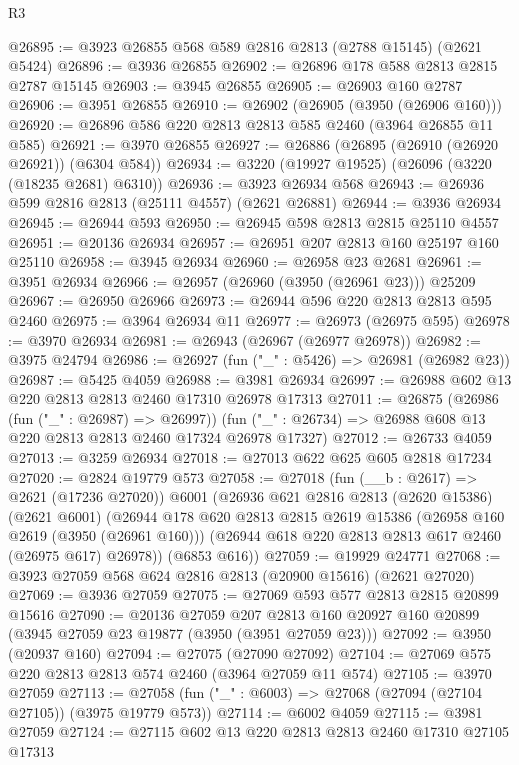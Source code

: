 \begin{lexlean}{R3}
\begin{coremodule}
@26895 := @3923 @26855 @568 @589 @2816 @2813 (@2788 @15145) (@2621 @5424)
@26896 := @3936 @26855
@26902 := @26896 @178 @588 @2813 @2815 @2787 @15145
@26903 := @3945 @26855
@26905 := @26903 @160 @2787
@26906 := @3951 @26855
@26910 := @26902 (@26905 (@3950 (@26906 @160)))
@26920 := @26896 @586 @220 @2813 @2813 @585 @2460 (@3964 @26855 @11 @585)
@26921 := @3970 @26855
@26927 := @26886 (@26895 (@26910 (@26920 @26921)) (@6304 @584))
@26934 := @3220 (@19927 @19525) (@26096 (@3220 (@18235 @2681) @6310))
@26936 := @3923 @26934 @568
@26943 := @26936 @599 @2816 @2813 (@25111 @4557) (@2621 @26881)
@26944 := @3936 @26934
@26945 := @26944 @593
@26950 := @26945 @598 @2813 @2815 @25110 @4557
@26951 := @20136 @26934
@26957 := @26951 @207 @2813 @160 @25197 @160 @25110
@26958 := @3945 @26934
@26960 := @26958 @23 @2681
@26961 := @3951 @26934
@26966 := @26957 (@26960 (@3950 (@26961 @23))) @25209
@26967 := @26950 @26966
@26973 := @26944 @596 @220 @2813 @2813 @595 @2460
@26975 := @3964 @26934 @11
@26977 := @26973 (@26975 @595)
@26978 := @3970 @26934
@26981 := @26943 (@26967 (@26977 @26978))
@26982 := @3975 @24794
@26986 := @26927 (fun ("_" : @5426) => @26981 (@26982 @23))
@26987 := @5425 @4059
@26988 := @3981 @26934
@26997 := @26988 @602 @13 @220 @2813 @2813 @2460 @17310 @26978 @17313
@27011 := @26875
    (@26986 (fun ("_" : @26987) => @26997))
    (fun ("_" : @26734) => @26988 @608 @13 @220 @2813 @2813 @2460 @17324 @26978 @17327)
@27012 := @26733 @4059
@27013 := @3259 @26934
@27018 := @27013 @622 @625 @605 @2818 @17234
@27020 := @2824 @19779 @573
@27058 := @27018
    (fun (__b : @2617) => @2621 (@17236 @27020))
    @6001
    (@26936
      @621
      @2816
      @2813
      (@2620 @15386)
      (@2621 @6001)
      (@26944
        @178
        @620
        @2813
        @2815
        @2619
        @15386
        (@26958 @160 @2619 (@3950 (@26961 @160)))
        (@26944 @618 @220 @2813 @2813 @617 @2460 (@26975 @617) @26978))
      (@6853 @616))
@27059 := @19929 @24771
@27068 := @3923 @27059 @568 @624 @2816 @2813 (@20900 @15616) (@2621 @27020)
@27069 := @3936 @27059
@27075 := @27069 @593 @577 @2813 @2815 @20899 @15616
@27090 := @20136
    @27059
    @207
    @2813
    @160
    @20927
    @160
    @20899
    (@3945 @27059 @23 @19877 (@3950 (@3951 @27059 @23)))
@27092 := @3950 (@20937 @160)
@27094 := @27075 (@27090 @27092)
@27104 := @27069 @575 @220 @2813 @2813 @574 @2460 (@3964 @27059 @11 @574)
@27105 := @3970 @27059
@27113 := @27058 (fun ("_" : @6003) => @27068 (@27094 (@27104 @27105)) (@3975 @19779 @573))
@27114 := @6002 @4059
@27115 := @3981 @27059
@27124 := @27115 @602 @13 @220 @2813 @2813 @2460 @17310 @27105 @17313

\end{coremodule}
\end{lexlean}

